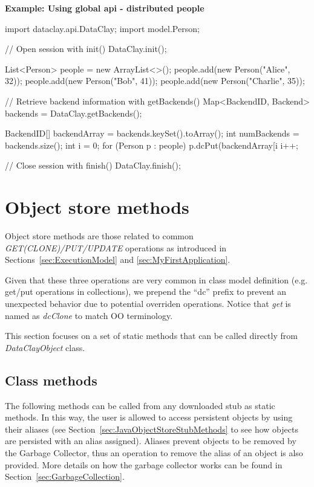 \begin{tBox}
\textcolor{basecolor} {\bf Example: Using global api - distributed people}
\begin{java}
import dataclay.api.DataClay;
import model.Person;

// Open session with init()
DataClay.init();

List<Person> people = new ArrayList<>();
people.add(new Person("Alice", 32));
people.add(new Person("Bob", 41));
people.add(new Person("Charlie", 35));

// Retrieve backend information with getBackends()
Map<BackendID, Backend> backends = DataClay.getBackends();

BackendID[] backendArray = backends.keySet().toArray();
int numBackends = backends.size();
int i = 0;
for (Person p : people) {
  p.dcPut(backendArray[i %
  i++;
}

// Close session with finish()
DataClay.finish();
\end{java}
\end{tBox}


\section{Object store methods}
\label{sec:JavaObjectStore}

Object store methods are those related to common \textit{GET(CLONE)/PUT/UPDATE} operations as introduced in Sections~\ref{sec:ExecutionModel} and \ref{sec:MyFirstApplication}.

Given that these three operations are very common in class model definition (e.g. get/put operations in collections), we prepend the ``dc'' prefix to prevent an unexpected behavior due to potential overriden operations. Notice that \textit{get} is named as \textit{dcClone} to match OO terminology.

This section focuses on a set of static methods that can be called directly from \textit{DataClayObject} class.



\subsection{Class methods}
\label{sec:JavaClassMethodsObjectStore}

The following methods can be called from any downloaded stub as static methods. In this way, the user is allowed to access persistent objects by using their aliases (see Section~\ref{sec:JavaObjectStoreStubMethods} to see how objects are persisted with an alias assigned). Aliases prevent objects to be removed by the Garbage Collector, thus an operation to remove the alias of an object is also provided. More details on how the garbage collector works can be found in Section~\ref{sec:GarbageCollection}. 


